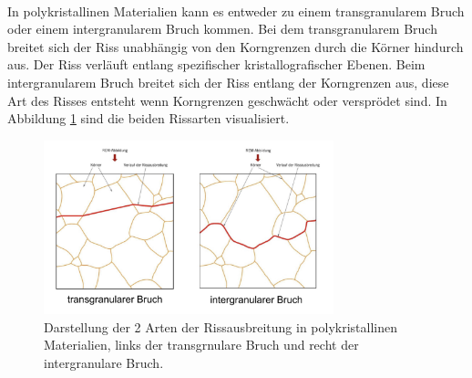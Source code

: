 \documentclass[11pt,a4paper]{article}
\numberwithin{equation}{section}
\numberwithin{figure}{section}
\begin{document}
\\
\begin{addmargin}[25pt]{0pt}
In polykristallinen Materialien kann es entweder zu einem transgranularem Bruch oder einem intergranularem Bruch kommen. Bei dem transgranularem Bruch breitet sich der Riss unabhängig von den Korngrenzen durch die Körner hindurch aus. Der Riss verläuft entlang spezifischer kristallografischer Ebenen. Beim intergranularem Bruch breitet sich der Riss entlang der Korngrenzen aus, diese Art des Risses entsteht wenn Korngrenzen geschwächt oder versprödet sind. In Abbildung \ref{fig:Rissausbreitung_polykristallin} sind die beiden Rissarten visualisiert.\\
\begin{figure}[h]
    \centering
    \includegraphics[width = 0.75\textwidth]{images/Materialwissenschaften/Rissausbreitung_polykristallin.jpeg}
    \caption{Darstellung der 2 Arten der Rissausbreitung in polykristallinen Materialien, links der transgrnulare Bruch und recht der intergranulare Bruch.}
    \label{fig:Rissausbreitung_polykristallin}
\end{figure}
\end{addmargin}
\end{document}
